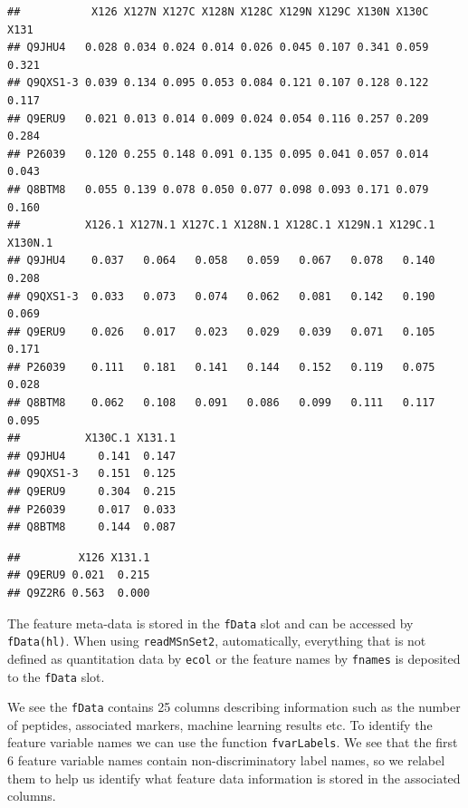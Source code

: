 \begin{verbatim}
##           X126 X127N X127C X128N X128C X129N X129C X130N X130C  X131
## Q9JHU4   0.028 0.034 0.024 0.014 0.026 0.045 0.107 0.341 0.059 0.321
## Q9QXS1-3 0.039 0.134 0.095 0.053 0.084 0.121 0.107 0.128 0.122 0.117
## Q9ERU9   0.021 0.013 0.014 0.009 0.024 0.054 0.116 0.257 0.209 0.284
## P26039   0.120 0.255 0.148 0.091 0.135 0.095 0.041 0.057 0.014 0.043
## Q8BTM8   0.055 0.139 0.078 0.050 0.077 0.098 0.093 0.171 0.079 0.160
##          X126.1 X127N.1 X127C.1 X128N.1 X128C.1 X129N.1 X129C.1 X130N.1
## Q9JHU4    0.037   0.064   0.058   0.059   0.067   0.078   0.140   0.208
## Q9QXS1-3  0.033   0.073   0.074   0.062   0.081   0.142   0.190   0.069
## Q9ERU9    0.026   0.017   0.023   0.029   0.039   0.071   0.105   0.171
## P26039    0.111   0.181   0.141   0.144   0.152   0.119   0.075   0.028
## Q8BTM8    0.062   0.108   0.091   0.086   0.099   0.111   0.117   0.095
##          X130C.1 X131.1
## Q9JHU4     0.141  0.147
## Q9QXS1-3   0.151  0.125
## Q9ERU9     0.304  0.215
## P26039     0.017  0.033
## Q8BTM8     0.144  0.087
\end{verbatim}

\begin{Shaded}
\begin{Highlighting}[]
\NormalTok{(hl)[}\NormalTok{(}\NormalTok{, }\NormalTok{), }\NormalTok{(}\NormalTok{, }\NormalTok{)]}
\end{Highlighting}
\end{Shaded}

\begin{verbatim}
##         X126 X131.1
## Q9ERU9 0.021  0.215
## Q9Z2R6 0.563  0.000
\end{verbatim}

The feature meta-data is stored in the \texttt{fData} slot and can be
accessed by \texttt{fData(hl)}. When using \texttt{readMSnSet2},
automatically, everything that is not defined as quantitation data by
\texttt{ecol} or the feature names by \texttt{fnames} is deposited to
the \texttt{fData} slot.

We see the \texttt{fData} contains 25 columns describing information
such as the number of peptides, associated markers, machine learning
results etc. To identify the feature variable names we can use the
function \texttt{fvarLabels}. We see that the first 6 feature variable
names contain non-discriminatory label names, so we relabel them to help
us identify what feature data information is stored in the associated
columns.

